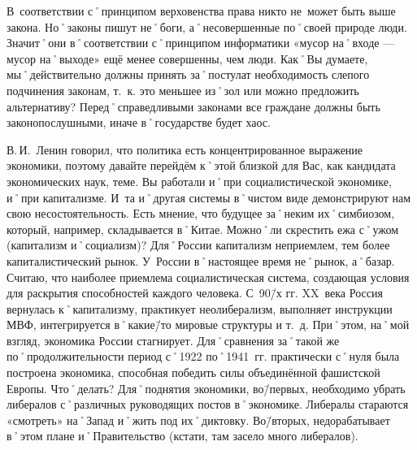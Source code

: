 \begin{drama}
	\pagebreak
	
	\maxspeaks В~соответствии с˚принципом верховенства права никто не~может быть выше закона. Но˚законы пишут не˚боги, а˚несовершенные по˚своей природе люди. Значит˚они в˚соответствии с˚принципом информатики  «мусор на˚входе — мусор на˚выходе» ещё менее совершенны, чем люди. Как˚Вы думаете, мы˚действительно должны принять за˚постулат необходимость слепого подчинения законам, т.~к. это меньшее из˚зол или можно предложить альтернативу?
	\michaelspeaks Перед˚справедливыми законами все граждане должны быть законопослушными, иначе в˚государстве будет хаос.

	\maxspeaks В.\,И.~Ленин говорил, что политика есть концентрированное выражение экономики, поэтому давайте перейдём к˚этой близкой для Вас, как кандидата экономических наук, теме. Вы работали и˚при социалистической экономике, и˚при капитализме. И~та и˚другая системы в˚чистом виде демонстрируют нам свою несостоятельность. Есть мнение, что будущее за˚неким их˚симбиозом, который, например, складывается в˚Китае. Можно˚ли скрестить ежа с˚ужом (капитализм и˚социализм)?
	\michaelspeaks Для˚России капитализм неприемлем, тем более капиталистический рынок. У~России в˚настоящее время не˚рынок, а˚базар. Считаю, что наиболее приемлема социалистическая система, создающая условия для раскрытия способностей каждого человека.
	\maxspeaks С~90\=/х гг. XX~века Россия вернулась к˚капитализму, практикует неолиберализм, выполняет инструкции МВФ, интегрируется в˚какие\=/то мировые структуры и т.~д. При˚этом, на˚мой взгляд, экономика России стагнирует. Для˚сравнения за˚такой же по˚продолжительности период с˚1922 по˚1941~гг. практически с˚нуля была построена экономика, способная победить силы объединённой фашистской Европы. Что˚делать? 
	\michaelspeaks Для˚поднятия экономики, во\=/первых, необходимо убрать либералов с˚различных руководящих постов в˚экономике. Либералы стараются «смотреть» на˚Запад и˚жить под их˚диктовку. Во\=/вторых, недорабатывает в˚этом плане и˚Правительство (кстати, там засело много либералов).


\end{drama}
